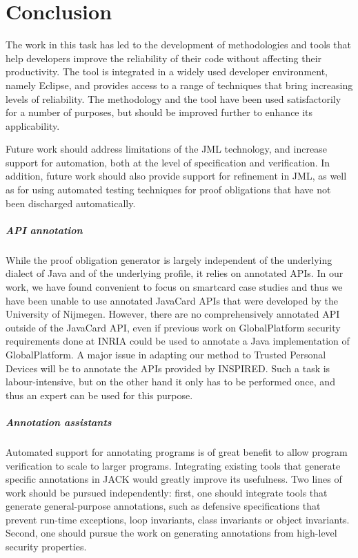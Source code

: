 \newcommand{\compil}[2]{\overline{#1}^{#2}}

\newcommand{\compilp}[1]{{\cal C}(#1)}


\chapter{Conclusion} 

The work in this task has led to the development of methodologies and
tools that help developers improve the reliability of their code
without affecting their productivity. The tool is integrated in a
widely used developer environment, namely Eclipse, and provides access
to a range of techniques that bring increasing levels of reliability.
The methodology and the tool have been used satisfactorily for a
number of purposes, but should be improved further to enhance its
applicability.

Future work should address limitations of the JML technology, and
increase support for automation, both at the level of specification
and verification. In addition, future work should also provide support
for refinement in JML, as well as for using automated testing
techniques for proof obligations that have not been discharged
automatically.


\paragraph{API annotation}
While the proof obligation generator is largely independent of the
underlying dialect of Java and of the underlying profile, it relies on
annotated APIs. In our work, we have found convenient to focus on
smartcard case studies and thus we have been unable to use annotated
JavaCard APIs that were developed by the University of Nijmegen.
However, there are no comprehensively annotated API outside of the
JavaCard API, even if previous work on GlobalPlatform security
requirements done at INRIA could be used to annotate a Java
implementation of GlobalPlatform. A major issue in adapting our method
to Trusted Personal Devices will be to annotate the APIs provided by
INSPIRED. Such a task is labour-intensive, but on the other hand it
only has to be performed once, and thus an expert can be used for this
purpose.

\paragraph{Annotation assistants}
Automated support for annotating programs is of great benefit to allow
program verification to scale to larger programs. Integrating existing
tools that generate specific annotations in JACK would greatly improve
its usefulness. Two lines of work should be pursued independently:
first, one should integrate tools that generate general-purpose
annotations, such as defensive specifications that prevent run-time
exceptions, loop invariants, class invariants or object invariants.
Second, one should pursue the work on generating annotations from 
high-level security properties.


